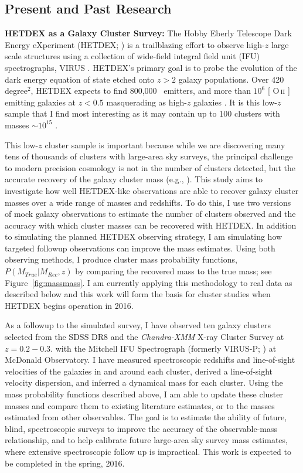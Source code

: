 \documentclass[overlapped, line, 11pt]{res}
\makeatletter
\newcommand{\degsq}{\hbox{degree$^2$}}
\newcommand{\eg}{e.g.}
\newcommand{\citeeg}[1]{(\eg, \citealt{#1})}
\DeclareRobustCommand{\ion}[2]{%
\relax\ifmmode
\ifx\testbx\f@series
{\mathbf{#1\,\mathsc{#2}}}\else
{\mathrm{#1\,\mathsc{#2}}}\fi
\else\textup{#1\,{\mdseries\textsc{#2}}}%
\fi}
\makeatother
\begin{document}
\begin{resume}
\section{\sc Present and Past Research}
\noindent \textbf{HETDEX as a Galaxy Cluster Survey:} The Hobby Eberly Telescope Dark Energy eXperiment (HETDEX; \citealt{Hill2008}) is a trailblazing effort to observe high-$z$ large scale structures using a collection of wide-field integral field unit (IFU) spectrographs, VIRUS \citep{Hill2012}. HETDEX's primary goal is to probe the evolution of the dark energy equation of state etched onto $z>2$ galaxy populations. Over 420 \degsq, HETDEX expects to find 800,000 \lya\ emitters, and more than $10^6$ [\ion{O}{ii}] emitting galaxies at $z<0.5$ masquerading as high-$z$ galaxies \citep{Acquaviva2014}. It is this low-$z$ sample that I find most interesting as it may contain up to 100 clusters with masses $\sim10^{15}$ \msol.

This low-$z$ cluster sample is important because while we are discovering many tens of thousands of clusters with large-area sky surveys, the principal challenge to modern precision cosmology is not in the number of clusters detected, but the accurate recovery of the galaxy cluster mass \citeeg{Sehgal2011,Plank2014, Bocquet2015}. This study aims to investigate how well HETDEX-like observations are able to recover galaxy cluster masses over a wide range of masses and redshifts. To do this, I use two versions of mock galaxy observations to estimate the number of clusters observed and the accuracy with which cluster masses can be recovered with HETDEX. In addition to simulating the planned HETDEX observing strategy, I am simulating how targeted followup observations can improve the mass estimates. Using both observing methods, I produce cluster mass probability functions, $P(M_{True}|M_{Rec},z)$ by comparing the recovered mass to the true mass; see Figure~\ref{fig:massmass}.  I am currently applying this methodology to real data as described below and this work will form the basis for cluster studies when HETDEX begins operation in 2016.

As a followup to the simulated survey, I have observed ten galaxy clusters selected from the SDSS DR8 and the \emph{Chandra-XMM} X-ray Cluster Survey \citep{Mehrtens2012} at $z=0.2-0.3$. with the Mitchell IFU Spectrograph (formerly VIRUS-P; \citealt{Hill2008a}) at McDonald Observatory. I have measured spectroscopic redshifts and line-of-sight velocities of the galaxies in and around each cluster, derived a line-of-sight velocity dispersion, and inferred a dynamical mass for each cluster. Using the mass probability functions described above, I am able to update these cluster masses and compare them to existing literature estimates, or to the masses estimated from other observables. The goal is to estimate the ability of future, blind, spectroscopic surveys to improve the accuracy of the observable-mass relationship, and to help calibrate future large-area sky survey mass estimates, where extensive spectroscopic follow up is impractical. This work is expected to be completed in the spring, 2016.\\


\end{resume}
\end{document}
